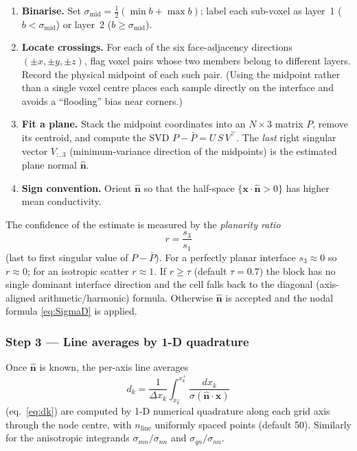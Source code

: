 \documentclass[11pt]{article}
\newcommand{\nn}{\hat{\bm{n}}}
\begin{document}
\begin{enumerate}
\item \textbf{Binarise.}  Set $\sigma_\mathrm{mid} = \tfrac{1}{2}(\min b + \max b)$;
      label each sub-voxel as layer~1 ($b < \sigma_\mathrm{mid}$) or
      layer~2 ($b \geq \sigma_\mathrm{mid}$).
\item \textbf{Locate crossings.}  For each of the six face-adjacency directions
      $(\pm x, \pm y, \pm z)$, flag voxel pairs whose two members belong to
      different layers.  Record the physical midpoint of each such pair.
      (Using the midpoint rather than a single voxel centre places each sample
      directly on the interface and avoids a ``flooding'' bias near corners.)
\item \textbf{Fit a plane.}  Stack the midpoint coordinates into an $N\times 3$
      matrix $P$, remove its centroid, and compute the SVD
      $P - \bar P = U\,S\,V^\top$.  The \emph{last} right singular vector
      $V_{:,3}$ (minimum-variance direction of the midpoints) is the estimated
      plane normal $\nn$.
\item \textbf{Sign convention.}  Orient $\nn$ so that the half-space
      $\{\bm{x}\cdot\nn > 0\}$ has higher mean conductivity.
\end{enumerate}

The confidence of the estimate is measured by the \emph{planarity ratio}
\[
  r = \frac{s_3}{s_1}
\]
(last to first singular value of $P - \bar P$).  For a perfectly planar
interface $s_3 \approx 0$ so $r \approx 0$; for an isotropic scatter
$r \approx 1$.  If $r \geq \tau$ (default $\tau = 0.7$) the block has no
single dominant interface direction and the cell falls back to the diagonal
(axis-aligned arithmetic/harmonic) formula.  Otherwise $\nn$ is accepted and
the nodal formula \eqref{eq:SigmaD} is applied.

\subsubsection*{Step 3 — Line averages by 1-D quadrature}

Once $\nn$ is known, the per-axis line averages
\[
  d_k = \frac{1}{\Delta x_k}\int_{x_k^-}^{x_k^+} \frac{dx_k}{\sigma(\nn\cdot\bm{x})}
\]
(eq.\ \eqref{eq:dk}) are computed by 1-D numerical quadrature along each
grid axis through the node centre, with $n_\mathrm{line}$ uniformly spaced
points (default 50).  Similarly for the anisotropic integrands
$\sigma_{mn}/\sigma_{nn}$ and $\sigma_{qn}/\sigma_{nn}$.
\end{document}
